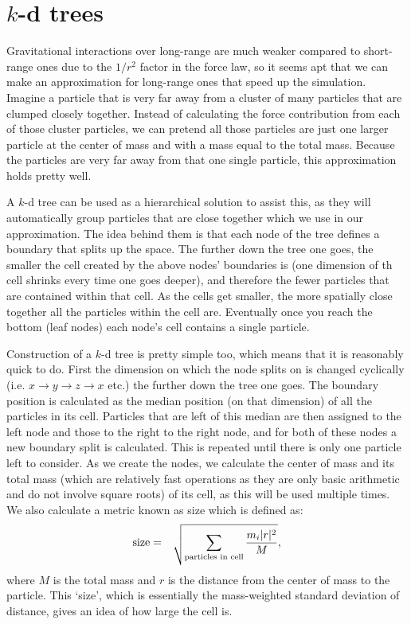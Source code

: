 \documentclass[11pt]{article}
\begin{document}

\section{$k$-d trees}
Gravitational interactions over long-range are much weaker compared to short-range ones due to the $1/r^2$ factor in the force law, so it seems apt that we can make an approximation for long-range ones that speed up the simulation.
Imagine a particle that is very far away from a cluster of many particles that are clumped closely together.
Instead of calculating the force contribution from each of those cluster particles, we can pretend all those particles are just one larger particle at the center of mass and with a mass equal to the total mass.
Because the particles are very far away from that one single particle, this approximation holds pretty well.


A $k$-d tree can be used as a hierarchical solution to assist this, as they will automatically group particles that are close together which we use in our approximation.
The idea behind them is that each node of the tree defines a boundary that splits up the space.
The further down the tree one goes, the smaller the cell created by the above nodes' boundaries is (one dimension of th cell shrinks every time one goes deeper), and therefore the fewer particles that are contained within that cell.
As the cells get smaller, the more spatially close together all the particles within the cell are.
Eventually once you reach the bottom (leaf nodes) each node's cell contains a single particle.

Construction of a $k$-d tree is pretty simple too, which means that it is reasonably quick to do.
First the dimension on which the node splits on is changed cyclically (i.e. $x \rightarrow y \rightarrow z \rightarrow x$ etc.) the further down the tree one goes.
The boundary position is calculated as the median position (on that dimension) of all the particles in its cell.
Particles that are left of this median are then assigned to the left node and those to the right to the right node, and for both of these nodes a new boundary split is calculated.
This is repeated until there is only one particle left to consider.
As we create the nodes, we calculate the center of mass and its total mass (which are relatively fast operations as they are only basic arithmetic and do not involve square roots) of its cell, as this will be used multiple times.
We also calculate a metric known as size which is defined as:
\begin{eqnarray}
	\textnormal{size} &=& \sqrt{\sum_{\textnormal{particles in cell}} \frac{m_i |r|^2}{M}},
\end{eqnarray}
where $M$ is the total mass and $r$ is the distance from the center of mass to the particle.
This `size', which is essentially the mass-weighted standard deviation of distance, gives an idea of how large the cell is.
\end{document}
